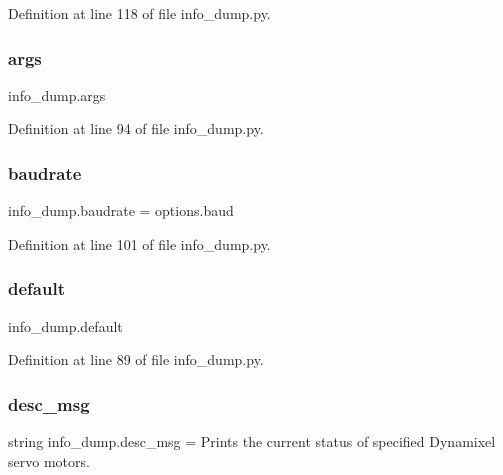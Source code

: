 Definition at line 118 of file info\+\_\+dump.\+py.

\mbox{\label{namespaceinfo__dump_a027c02ad18aa7a853a517433230af8a1}} 
\subsubsection{\texorpdfstring{args}{args}}
{\footnotesize\ttfamily info\+\_\+dump.\+args}



Definition at line 94 of file info\+\_\+dump.\+py.

\mbox{\label{namespaceinfo__dump_aa7d6b35ec273c6b59d04e755217a0134}} 
\subsubsection{\texorpdfstring{baudrate}{baudrate}}
{\footnotesize\ttfamily info\+\_\+dump.\+baudrate = options.\+baud}



Definition at line 101 of file info\+\_\+dump.\+py.

\mbox{\label{namespaceinfo__dump_a82df11e8a469a00e4d6cd392074a43bf}} 
\subsubsection{\texorpdfstring{default}{default}}
{\footnotesize\ttfamily info\+\_\+dump.\+default}



Definition at line 89 of file info\+\_\+dump.\+py.

\mbox{\label{namespaceinfo__dump_afa18e188fcfcb13b0f16523f97422078}} 
\subsubsection{\texorpdfstring{desc\+\_\+msg}{desc\_msg}}
{\footnotesize\ttfamily string info\+\_\+dump.\+desc\+\_\+msg = \textquotesingle{}Prints the current status of specified Dynamixel servo motors.\textquotesingle{}}




